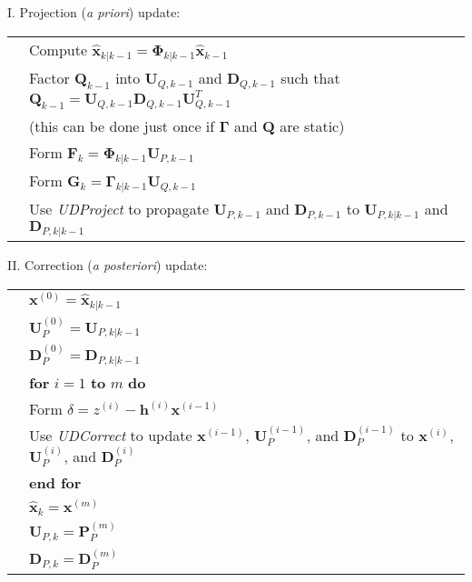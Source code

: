 I. Projection (\textit{a priori}) update:

\begingroup
\renewcommand{\arraystretch}{1.25}
\begin{tabular}{l l}
\phantom{.} & Compute $\hat{\mathbf{x}}_{k|k-1} = \mathbf{\Phi}_{k|k-1} \hat{\mathbf{x}}_{k-1}$ \\
\phantom{.} & Factor $\mathbf{Q}_{k-1}$ into $\mathbf{U}_{Q,k-1}$ and $\mathbf{D}_{Q,k-1}$ such that
    $\mathbf{Q}_{k-1} = \mathbf{U}_{Q,k-1} \mathbf{D}_{Q,k-1} \mathbf{U}_{Q,k-1}^T$\\
\phantom{.} & \phantom{MM} (this can be done just once if $\mathbf{\Gamma}$ and $\mathbf{Q}$ are static) \\
\phantom{.} & Form $\mathbf{F}_k = \mathbf{\Phi}_{k|k-1} \mathbf{U}_{P,k-1}$\\
\phantom{.} & Form $\mathbf{G}_k = \mathbf{\Gamma}_{k|k-1} \mathbf{U}_{Q,k-1}$\\
\phantom{.} & Use \textit{UDProject} to propagate $\mathbf{U}_{P,k-1}$ and $\mathbf{D}_{P,k-1}$
    to $\mathbf{U}_{P,k|k-1}$ and $\mathbf{D}_{P,k|k-1}$
\end{tabular}
\endgroup

II. Correction (\textit{a posteriori}) update:

\begingroup
\renewcommand{\arraystretch}{1.25}
\begin{tabular}{l l}
\phantom{.} & $\mathbf{x}^{(0)} = \hat{\mathbf{x}}_{k|k-1}$ \\
\phantom{.} & $\mathbf{U}_P^{(0)} = \mathbf{U}_{P,k|k-1}$ \\
\phantom{.} & $\mathbf{D}_P^{(0)} = \mathbf{D}_{P,k|k-1}$ \\
\phantom{.} & \textbf{for} $i = 1$ \textbf{to} $m$ \textbf{do} \\
\phantom{.} & \phantom{MM} Form ${\delta} = {z}^{(i)} - \mathbf{h}^{(i)} \mathbf{x}^{(i-1)}$ \\
\phantom{.} & \phantom{MM} Use \textit{UDCorrect} to update $\mathbf{x}^{(i-1)}$, $\mathbf{U}_P^{(i-1)}$,
    and $\mathbf{D}_P^{(i-1)}$ to $\mathbf{x}^{(i)}$, $\mathbf{U}_P^{(i)}$, and $\mathbf{D}_P^{(i)}$ \\
\phantom{.} & \textbf{end for} \\
\phantom{.} & $\hat{\mathbf{x}}_{k} = \mathbf{x}^{(m)}$ \\
\phantom{.} & $\mathbf{U}_{P,k} = \mathbf{P}_P^{(m)}$ \\
\phantom{.} & $\mathbf{D}_{P,k} = \mathbf{D}_P^{(m)}$
\end{tabular}
\endgroup

